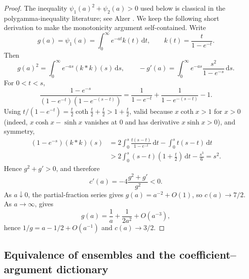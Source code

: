 \documentclass[11pt,a4paper]{amsart}
\numberwithin{equation}{section}
\theoremstyle{plain}
\theoremstyle{definition}
\newcommand{\dd}{\,\mathrm d}
\begin{document}
\begin{proof}
The inequality \(\psi_1(a)^2+\psi_2(a)>0\) used below is classical in the
polygamma-inequality literature; see Alzer \cite[eq.~(4.39) in the proof of Thm.~4.8]{Alzer2004Polygamma}.  We keep
the following short derivation to make the monotonicity argument
self-contained.  Write
\[
 g(a)=\psi_1(a)=\int_0^\infty e^{-at}k(t)\dd t,
 \qquad
 k(t)=\frac{t}{1-e^{-t}}.
\]
Then
\[
 g(a)^2=\int_0^\infty e^{-as}(k*k)(s)\dd s,
 \qquad
 -g'(a)=\int_0^\infty e^{-as}\frac{s^2}{1-e^{-s}}\dd s.
\]
For \(0<t<s\),
\[
 \frac{1-e^{-s}}
 {(1-e^{-t})(1-e^{-(s-t)})}
 =\frac1{1-e^{-t}}+\frac1{1-e^{-(s-t)}}-1.
\]
Using \(t/(1-e^{-t})=\frac t2\coth\frac t2+\frac t2>1+\frac t2\), valid because
\(x\coth x>1\) for \(x>0\) (indeed, \(x\cosh x-\sinh x\) vanishes at \(0\)
and has derivative \(x\sinh x>0\)), and symmetry,
\begin{align*}
 (1-e^{-s})(k*k)(s)
 &=2\int_0^s\frac{t(s-t)}{1-e^{-t}}\dd t
   -\int_0^s t(s-t)\dd t\\
 &>2\int_0^s(s-t)\left(1+\frac t2\right)\dd t-\frac{s^3}{6}
 =s^2.
\end{align*}
Hence \(g^2+g'>0\), and therefore
\[
 c'(a)=-4\frac{g^2+g'}{g^2}<0.
\]
As \(a\downarrow0\), the partial-fraction series gives
\(g(a)=a^{-2}+O(1)\), so \(c(a)\to7/2\).  As \(a\to\infty\),
 gives
\[
 g(a)=\frac1a+\frac1{2a^2}+O(a^{-3}),
\]
hence \(1/g=a-1/2+O(a^{-1})\) and \(c(a)\to3/2\).
\end{proof}

\subsection{Equivalence of ensembles and the coefficient--argument dictionary}\label{subsec:ensemble-equivalence}
\end{document}
